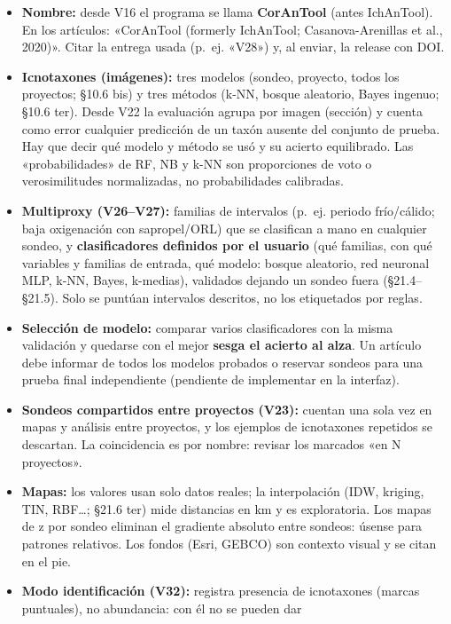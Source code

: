 \documentclass[
  10pt,
]{article}
\providecommand{\tightlist}{%
  \setlength{\itemsep}{0pt}\setlength{\parskip}{0pt}}
\begin{document}
\begin{itemize}
\tightlist
\item
  \textbf{Nombre:} desde V16 el programa se llama \textbf{CorAnTool}
  (antes IchAnTool). En los artículos: «CorAnTool (formerly IchAnTool;
  Casanova-Arenillas et al., 2020)». Citar la entrega usada (p.~ej.
  «V28») y, al enviar, la release con DOI.
\item
  \textbf{Icnotaxones (imágenes):} tres modelos (sondeo, proyecto, todos
  los proyectos; §10.6 bis) y tres métodos (k-NN, bosque aleatorio,
  Bayes ingenuo; §10.6 ter). Desde V22 la evaluación agrupa por imagen
  (sección) y cuenta como error cualquier predicción de un taxón ausente
  del conjunto de prueba. Hay que decir qué modelo y método se usó y su
  acierto equilibrado. Las «probabilidades» de RF, NB y k-NN son
  proporciones de voto o verosimilitudes normalizadas, no probabilidades
  calibradas.
\item
  \textbf{Multiproxy (V26--V27):} familias de intervalos (p.~ej. periodo
  frío/cálido; baja oxigenación con sapropel/ORL) que se clasifican a
  mano en cualquier sondeo, y \textbf{clasificadores definidos por el
  usuario} (qué familias, con qué variables y familias de entrada, qué
  modelo: bosque aleatorio, red neuronal MLP, k-NN, Bayes, k-medias),
  validados dejando un sondeo fuera (§21.4--§21.5). Solo se puntúan
  intervalos descritos, no los etiquetados por reglas.
\item
  \textbf{Selección de modelo:} comparar varios clasificadores con la
  misma validación y quedarse con el mejor \textbf{sesga el acierto al
  alza}. Un artículo debe informar de todos los modelos probados o
  reservar sondeos para una prueba final independiente (pendiente de
  implementar en la interfaz).
\item
  \textbf{Sondeos compartidos entre proyectos (V23):} cuentan una sola
  vez en mapas y análisis entre proyectos, y los ejemplos de icnotaxones
  repetidos se descartan. La coincidencia es por nombre: revisar los
  marcados «en N proyectos».
\item
  \textbf{Mapas:} los valores usan solo datos reales; la interpolación
  (IDW, kriging, TIN, RBF\ldots; §21.6 ter) mide distancias en km y es
  exploratoria. Los mapas de z por sondeo eliminan el gradiente absoluto
  entre sondeos: úsense para patrones relativos. Los fondos (Esri,
  GEBCO) son contexto visual y se citan en el pie.
\item
  \textbf{Modo identificación (V32):} registra presencia de icnotaxones
  (marcas puntuales), no abundancia: con él no se pueden dar

\end{itemize}
\end{document}
